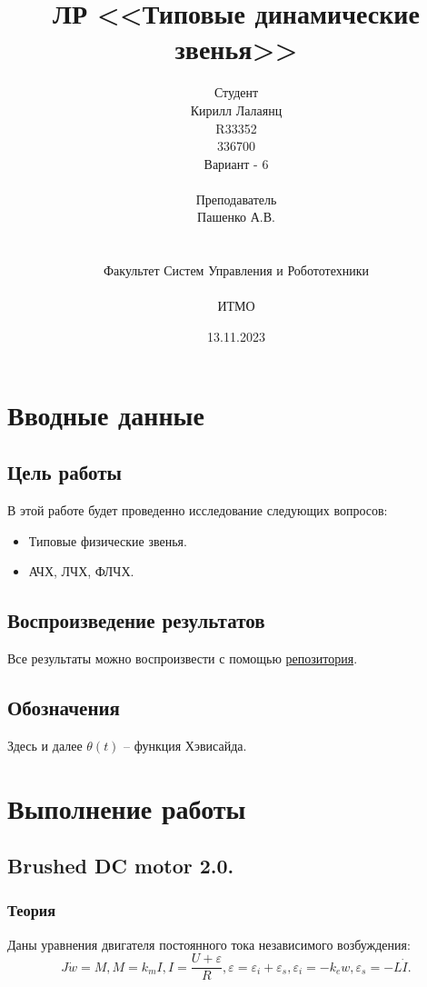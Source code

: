 \documentclass[16pt]{article}
\title{ЛР \textnumero 5 <<Типовые динамические звенья>>}
\author{
Студент \\
Кирилл Лалаянц\\
R33352\\
336700\\
Вариант - 6\\
\\
Преподаватель\\
Пашенко А.В. \\
\\
\\
Факультет Систем Управления и Робототехники\\
\\
ИТМО\\
}
\date{13.11.2023}
\begin{document}
\maketitle
\newpage
\tableofcontents
\thispagestyle{empty}

\newpage
\setcounter{page}{1}
\section{Вводные данные}
\subsection{Цель работы}
В этой работе будет проведенно исследование следующих вопросов:
\begin{itemize}
    \item Типовые физические звенья.
    \item АЧХ, ЛЧХ, ФЛЧХ.
\end{itemize} 

\subsection{Воспроизведение результатов}
Все результаты можно воспроизвести с помощью \href{https://github.com/lalayants/control-theory-itmo-2023}{репозитория}.

\subsection{Обозначения}
Здесь и далее \(\theta(t)\) -- функция Хэвисайда.

\newpage
\section{Выполнение работы}
\label{sec:headings}


\subsection{Brushed DC motor 2.0.}

\subsubsection{Теория}
Даны уравнения двигателя постоянного тока независимого возбуждения:
\[J\dot{w} = M, M = k_mI, I = \frac{U + \varepsilon}{R}, \varepsilon = \varepsilon_i + \varepsilon_s, \varepsilon_i = -k_ew, \varepsilon_s=-L\dot{I}.\]
\end{document}
